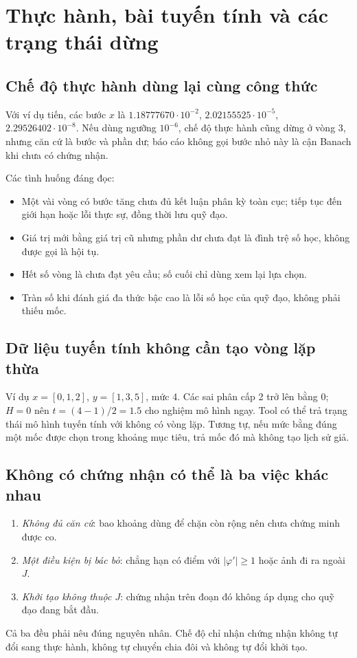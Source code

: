 \section{Thực hành, bài tuyến tính và các trạng thái dừng}
\label{sec:inverse-practical}
\subsection{Chế độ thực hành dùng lại cùng công thức}
Với ví dụ tiến, các bước $x$ là $1.18777670\cdot10^{-2}$, $2.02155525\cdot10^{-5}$, $2.29526402\cdot10^{-8}$. Nếu dùng ngưỡng $10^{-6}$, chế độ thực hành cũng dừng ở vòng 3, nhưng căn cứ là bước và phần dư; báo cáo không gọi bước nhỏ này là cận Banach khi chưa có chứng nhận.

Các tình huống đáng đọc:
\begin{itemize}
\item Một vài vòng có bước tăng chưa đủ kết luận phân kỳ toàn cục; tiếp tục đến giới hạn hoặc lỗi thực sự, đồng thời lưu quỹ đạo.
\item Giá trị mới bằng giá trị cũ nhưng phần dư chưa đạt là đình trệ số học, không được gọi là hội tụ.
\item Hết số vòng là chưa đạt yêu cầu; số cuối chỉ dùng xem lại lựa chọn.
\item Tràn số khi đánh giá đa thức bậc cao là lỗi số học của quỹ đạo, không phải thiếu mốc.
\end{itemize}

\subsection{Dữ liệu tuyến tính không cần tạo vòng lặp thừa}
Ví dụ $x=[0,1,2]$, $y=[1,3,5]$, mức 4. Các sai phân cấp 2 trở lên bằng 0; $H=0$ nên $t=(4-1)/2=1.5$ cho nghiệm mô hình ngay. Tool có thể trả trạng thái mô hình tuyến tính với không có vòng lặp. Tương tự, nếu mức bằng đúng một mốc được chọn trong khoảng mục tiêu, trả mốc đó mà không tạo lịch sử giả.

\subsection{Không có chứng nhận có thể là ba việc khác nhau}
\begin{enumerate}
\item \emph{Không đủ căn cứ}: bao khoảng dùng để chặn còn rộng nên chưa chứng minh được co.
\item \emph{Một điều kiện bị bác bỏ}: chẳng hạn có điểm với $|\varphi'|\ge1$ hoặc ảnh đi ra ngoài $J$.
\item \emph{Khởi tạo không thuộc $J$}: chứng nhận trên đoạn đó không áp dụng cho quỹ đạo đang bắt đầu.
\end{enumerate}
Cả ba đều phải nêu đúng nguyên nhân. Chế độ chỉ nhận chứng nhận không tự đổi sang thực hành, không tự chuyển chia đôi và không tự đổi khởi tạo.


